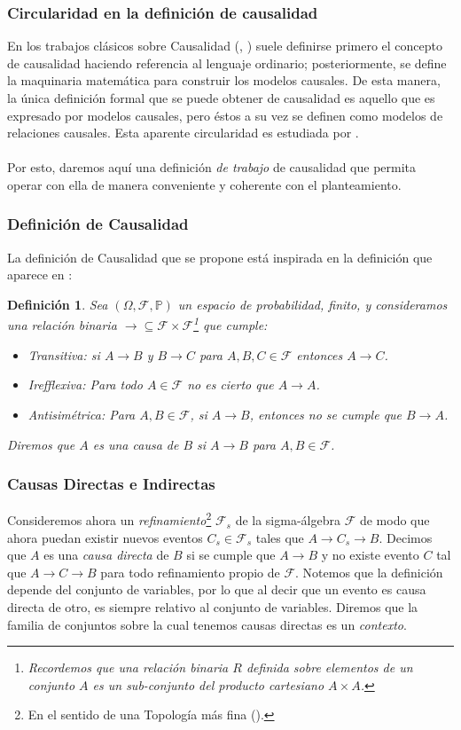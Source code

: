 \documentclass[11pt]{article}
\theoremstyle{plain}
\newtheorem{defi}[teo]{Definición}
\begin{document}
\subsubsection{Circularidad en la definición de causalidad}
En los trabajos clásicos sobre Causalidad (\cite{spirtes2000causation}, \cite{pearl2009causality}) suele definirse primero el concepto de causalidad haciendo referencia al lenguaje ordinario; posteriormente, se define la maquinaria matemática para construir los modelos causales. De esta manera, la única definición formal que se puede obtener de causalidad es aquello que es expresado por modelos causales, pero éstos a su vez se definen como modelos de relaciones causales. Esta aparente circularidad es estudiada por \cite{woodward2005making}.\\
\\
Por esto, daremos aquí una definición \textit{de trabajo} de causalidad que permita operar con ella de manera conveniente y coherente con el planteamiento.

\subsubsection{Definición de Causalidad}
La definición de Causalidad que se propone está inspirada en la definición que aparece en \cite{spirtes2000causation}:
\begin{defi}{\label{defcausa}}
Sea $(\Omega, \mathcal{F}, \mathbb{P})$ un espacio de probabilidad, finito, y consideramos una relación binaria $\to  \subseteq \mathcal{F} \times \mathcal{F}$\footnote{Recordemos que una relación binaria $R$ definida sobre elementos de un conjunto $A$ es un sub-conjunto del producto cartesiano $A \times A$.} que cumple:
\begin{itemize}
\item Transitiva: si $A \to B$ y $B \to C$ para $A,B,C \in \mathcal{F}$ entonces $A \to C$.
\item Irefflexiva: Para todo $A \in \mathcal{F}$ no es cierto que $A \to A$.
\item Antisimétrica: Para $A, B \in \mathcal{F}$, si $A \to B$, entonces no se cumple que $B \to A$.
\end{itemize}
Diremos que $A$ es una causa de $B$ si $A \to B$ para $A,B \in \mathcal{F}$.
\end{defi}

\subsubsection{Causas Directas e Indirectas}
Consideremos ahora un \textit{refinamiento}\footnote{En el sentido de una Topología más fina (\cite{munkres2000topology}).} $\mathcal{F}_s$ de la sigma-álgebra $\mathcal{F}$ de modo que ahora puedan existir nuevos eventos $C_s \in \mathcal{F}_s$ tales que $A \to C_s \to B$. Decimos que $A$ es una \textit{causa directa} de $B$ si se cumple que $A \to B$ y no existe evento $C$ tal que $A \to C \to B$ para todo refinamiento propio de $\mathcal{F}$. Notemos que la definición depende del conjunto de variables, por lo que al decir que un evento es causa directa de otro, es siempre relativo al conjunto de variables. Diremos que la familia de conjuntos sobre la cual tenemos causas directas es un \textit{contexto}. 
\end{document}
